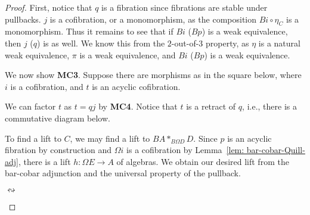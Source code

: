 \documentclass[../thesis.tex]{subfiles}
\begin{document}
\begin{proof}
                First, notice that $q$ is a fibration since fibrations are stable under pullbacks. $j$ is a cofibration, or a monomorphism, as the composition $Bi\circ \eta_C$ is a monomorphism. Thus it remains to see that if $Bi$ ($Bp$) is a weak equivalence, then $j$ ($q$) is as well. We know this from the $2$-out-of-$3$ property, as $\eta$ is a natural weak equivalence, $\pi$ is a weak equivalence, and $Bi$ ($Bp$) is a weak equivalence.
                
                We now show \textbf{MC3}. Suppose there are morphisms as in the square below, where $i$ is a cofibration, and $t$ is an acyclic cofibration.
                \begin{center}
                \end{center}
                
                We can factor $t$ as $t = qj$ by \textbf{MC4}. Notice that $t$ is a retract of $q$, i.e., there is a commutative diagram below.
                \begin{center}
                \end{center}
                
                To find a lift to $C$, we may find a lift to $BA\ast_{B\Omega D}D$. Since $p$ is an acyclic fibration by construction and $\Omega i$ is a cofibration by Lemma~\ref{lem: bar-cobar-Quill-adj}, there is a lift $h: \Omega E \rightarrow A$ of algebras. We obtain our desired lift from the bar-cobar adjunction and the universal property of the pullback.
                \begin{center}
                     $\leftrightsquigarrow$
            \end{center}
        \end{proof}
\end{document}
